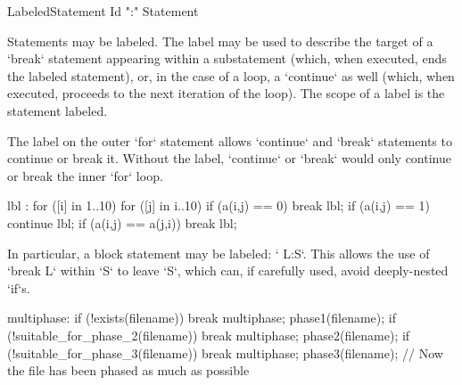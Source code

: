 \begin{bbgrammar}
    LabeledStatement \: Id \xcd":" Statement 
\end{bbgrammar}


Statements may be labeled. The label may be used to describe the target of a
\xcd`break` statement appearing within a substatement (which, when executed,
ends the labeled statement), or, in the case of a loop, a \xcd`continue` as
well (which, when executed, proceeds to the next iteration of the loop). The
scope of a label is the statement labeled.

\begin{ex}
The label on the outer \xcd`for` statement allows \xcd`continue` and
\xcd`break` statements to continue or break it.  Without the label,
\xcd`continue` or \xcd`break` would only continue or break the inner \xcd`for`
loop. 
\begin{xten}
lbl : for ([i] in 1..10) {
   for ([j] in i..10) {  
      if (a(i,j) == 0) break lbl;
      if (a(i,j) == 1) continue lbl;
      if (a(i,j) == a(j,i)) break lbl;
   }
}
\end{xten}
\end{ex}

In particular, a block statement may be labeled: \xcd` L:{S}`.  This allows
the use of \xcd`break L` within \xcd`S` to leave \xcd`S`, which can, if
carefully used, avoid deeply-nested \xcd`if`s. 

\begin{ex}
\begin{xten}
multiphase: {
  if (!exists(filename)) break multiphase;
  phase1(filename);
  if (!suitable_for_phase_2(filename)) break multiphase;
  phase2(filename);
  if (!suitable_for_phase_3(filename)) break multiphase;
  phase3(filename);
}
// Now the file has been phased as much as possible
\end{xten}
\end{ex}


